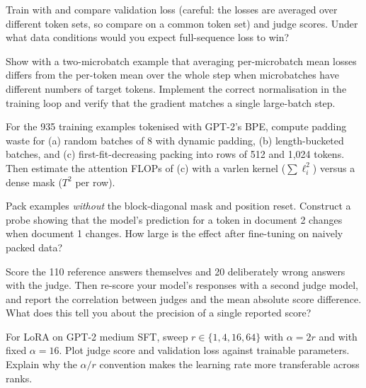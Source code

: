 \begin{exercise}
Train with  and compare validation loss (careful: the losses are
averaged over different token sets, so compare on a common token set) and judge scores.
Under what data conditions would you expect full-sequence loss to win?
\end{exercise}

\begin{exercise}
Show with a two-microbatch example that averaging per-microbatch mean losses differs
from the per-token mean over the whole step when microbatches have different numbers
of target tokens. Implement the correct normalisation in the training loop and verify
that the gradient matches a single large-batch step.
\end{exercise}

\begin{exercise}
For the 935 training examples tokenised with GPT-2's BPE, compute padding waste for
(a) random batches of 8 with dynamic padding, (b) length-bucketed batches, and
(c) first-fit-decreasing packing into rows of 512 and 1{,}024 tokens. Then estimate the
attention FLOPs of (c) with a varlen kernel ($\sum\ell_i^2$) versus a dense mask
($T^2$ per row).
\end{exercise}

\begin{exercise}
Pack examples \emph{without} the block-diagonal mask and position reset. Construct a
probe showing that the model's prediction for a token in document 2 changes when
document 1 changes. How large is the effect after fine-tuning on naively packed data?
\end{exercise}

\begin{exercise}
Score the 110 reference answers themselves and 20 deliberately wrong answers with the
judge. Then re-score your model's responses with a second judge model, and report the
correlation between judges and the mean absolute score difference. What does this tell
you about the precision of a single reported score?
\end{exercise}

\begin{exercise}
For LoRA on GPT-2 medium SFT, sweep $r\in\{1,4,16,64\}$ with $\alpha=2r$ and with fixed
$\alpha=16$. Plot judge score and validation loss against trainable parameters. Explain
why the $\alpha/r$ convention makes the learning rate more transferable across ranks.
\end{exercise}

